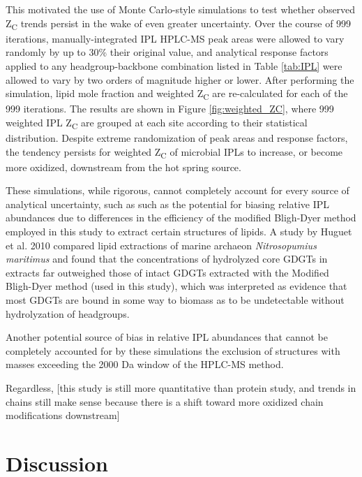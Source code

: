 This motivated the use of Monte Carlo-style simulations to test whether observed Z\textsubscript{C} trends persist in the wake of even greater uncertainty. Over the course of 999 iterations, manually-integrated IPL HPLC-MS peak areas were allowed to vary randomly by up to 30\% their original value, and analytical response factors applied to any headgroup-backbone combination listed in Table \ref{tab:IPL} were allowed to vary by two orders of magnitude higher or lower. After performing the simulation, lipid mole fraction and weighted Z\textsubscript{C} are re-calculated for each of the 999 iterations. The results are shown in Figure \ref{fig:weighted_ZC}, where 999 weighted IPL Z\textsubscript{C} are grouped at each site according to their statistical distribution. Despite extreme randomization of peak areas and response factors, the tendency persists for weighted Z\textsubscript{C} of microbial IPLs to increase, or become more oxidized, downstream from the hot spring source.

These simulations, while rigorous, cannot completely account for every source of analytical uncertainty, such as such as the potential for biasing relative IPL abundances due to differences in the efficiency of the modified Bligh-Dyer method employed in this study to extract certain structures of lipids. A study by Huguet et al. 2010 compared lipid extractions of marine archaeon \textit{Nitrosopumius maritimus} and found that the concentrations of hydrolyzed core GDGTs in extracts far outweighed those of intact GDGTs extracted with the Modified Bligh-Dyer method (used in this study), which was interpreted as evidence that most GDGTs are bound in some way to biomass as to be undetectable without hydrolyzation of headgroups.

Another potential source of bias in relative IPL abundances that cannot be completely accounted for by these simulations the exclusion of structures with masses exceeding the 2000 Da window of the HPLC-MS method.

Regardless, [this study is still more quantitative than protein study, and trends in chains still make sense because there is a shift toward more oxidized chain modifications downstream]



\section{Discussion}

